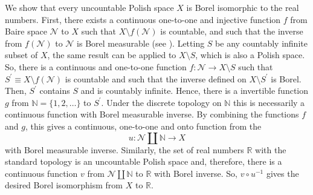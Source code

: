 \documentclass[12pt]{article}
\begin{document}

We show that every uncountable Polish space $X$ is Borel isomorphic to the real numbers.
First, there exists a continuous one-to-one and injective function $f$ from Baire space $\mathcal{N}$ to $X$ such that $X\setminus f(\mathcal{N})$ is countable, and such that the inverse from $f(\mathcal{N})$ to $\mathcal{N}$ is Borel measurable (see ).
Letting $S$ be any countably infinite subset of $X$, the same result can be applied to $X\setminus S$, which is also a Polish space.
So, there is a continuous and one-to-one function $f\colon \mathcal{N}\rightarrow X\setminus S$ such that $S^\prime\equiv X\setminus f(\mathcal{N})$ is countable and such that the inverse defined on $X\setminus S^\prime$ is Borel.
Then, $S^\prime$ contains $S$ and is countably infinite.
Hence, there is a invertible function $g$ from $\mathbb{N}=\{1,2,\ldots\}$ to $S^\prime$. Under the discrete topology on $\mathbb{N}$ this is necessarily a continuous function with Borel measurable inverse. By combining the functions $f$ and $g$, this gives a continuous, one-to-one and onto function from the 
\begin{equation*}
u\colon \mathcal{N}\coprod\mathbb{N}\rightarrow X
\end{equation*}
with Borel measurable inverse.
Similarly, the set of real numbers $\mathbb{R}$ with the standard topology is an uncountable Polish space and, therefore, there is a continuous function $v$ from $\mathcal{N}\coprod\mathbb{N}$ to $\mathbb{R}$ with Borel inverse. So, $v\circ u^{-1}$ gives the desired Borel isomorphism from $X$ to $\mathbb{R}$.

\end{document}
